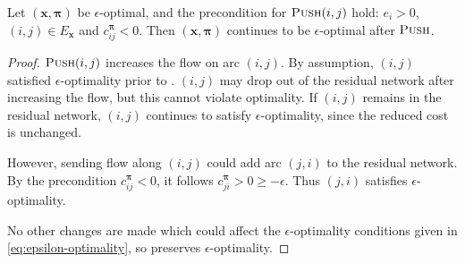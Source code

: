 \begin{lemma} \label{lemma:cost-scaling-push-correctness}
    Let $\left(\mathbf{x},\boldsymbol{\pi}\right)$ be $\epsilon$-optimal, and the precondition for $\textproc{Push}(i,j)$ hold: $e_i > 0$, $(i,j) \in E_{\mathbf{x}}$ and $c^{\boldsymbol{\pi}}_{ij} < 0$. Then $\left(\mathbf{x},\boldsymbol{\pi}\right)$ continues to be $\epsilon$-optimal after $\textproc{Push}$.
\end{lemma}
\begin{proof}
    $\textproc{Push}(i,j)$ increases the flow on arc $(i,j)$. By assumption, $(i,j)$ satisfied $\epsilon$-optimality prior to . $(i,j)$ may drop out of the residual network after increasing the flow, but this cannot violate optimality. If $(i,j)$ remains in the residual network, $(i,j)$ continues to satisfy $\epsilon$-optimality, since the reduced cost is unchanged.
    
    However, sending flow along $(i,j)$ could add arc $(j,i)$ to the residual network. By the precondition $c^{\boldsymbol{\pi}}_{ij} < 0$, it follows $c^{\boldsymbol{\pi}}_{ji} > 0 \geq -\epsilon$. Thus $(j,i)$ satisfies $\epsilon$-optimality.
    
    No other changes are made which could affect the $\epsilon$-optimality conditions given in \cref{eq:epsilon-optimality}, so  preserves $\epsilon$-optimality.
\end{proof}

